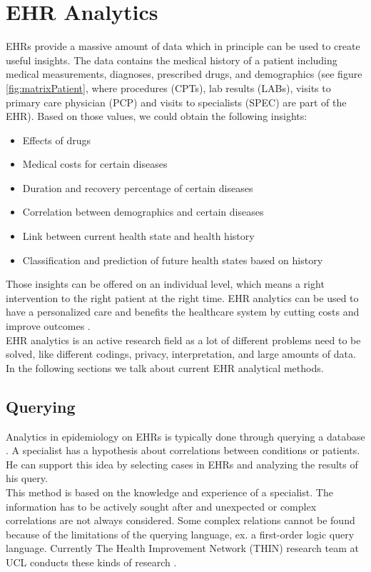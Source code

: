 \section{EHR Analytics}
\label{sec:ehra}

EHRs provide a massive amount of data which in principle can be used to create useful insights. The data contains the medical history of a patient including medical measurements, diagnoses, prescribed drugs, and demographics (see figure \ref{fig:matrixPatient}, where procedures (CPTs), lab results (LABs), visits to primary care physician (PCP) and visits to specialists (SPEC) are part of the EHR). Based on those values, we could obtain the following insights:

\begin{itemize}

\item Effects of drugs
\item Medical costs for certain diseases
\item Duration and recovery percentage of certain diseases
\item Correlation between demographics and certain diseases
\item Link between current health state and health history
\item Classification and prediction of future health states based on history

\end{itemize}

Those insights can be offered on an individual level, which means a right intervention to the right patient at the right time. EHR analytics can be used to have a personalized care and benefits the healthcare system by cutting costs and improve outcomes \cite{rand1:article}. \\

EHR analytics is an active research field as a lot of different problems need to be solved, like different codings, privacy, interpretation, and large amounts of data. In the following sections we talk about current EHR analytical methods.


\subsection{Querying}

Analytics in epidemiology on EHRs is typically done through querying a database \cite{EHRquery:journal}. A specialist has a hypothesis about correlations between conditions or patients. He can support this idea by selecting cases in EHRs and analyzing the results of his query. \\
This method is based on the knowledge and experience of a specialist. The information has to be actively sought after and unexpected or complex correlations are not always considered. Some complex relations cannot be found because of the limitations of the querying language, ex. a first-order logic query language. Currently The Health Improvement Network (THIN) research team at UCL conducts these kinds of research \cite{THIN:online}.

